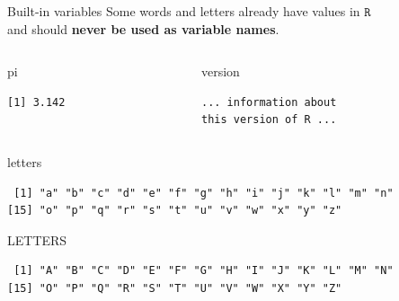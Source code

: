 \documentclass[
  11pt,
  ignorenonframetext,
]{beamer}
\newenvironment{Shaded}{\begin{snugshade}}{\end{snugshade}}
\newcommand{\NormalTok}[1]{#1}
\newcommand{\R}{\texttt{R}}
\begin{document}
\begin{frame}[fragile]{Built-in variables}
\protect\hypertarget{built-in-variables}{}
Some words and letters already have values in \(\R\)\\
and should \textbf{never be used as variable names}.

\begin{columns}[T,onlytextwidth]
\begin{column}{0.45\textwidth}
\begin{Shaded}
\begin{Highlighting}[]
\NormalTok{pi}
\end{Highlighting}
\end{Shaded}

\begin{verbatim}
[1] 3.142
\end{verbatim}
\end{column}

\begin{column}{0.45\textwidth}
\begin{Shaded}
\begin{Highlighting}[]
\NormalTok{version}
\end{Highlighting}
\end{Shaded}

\begin{verbatim}
... information about 
this version of R ...
\end{verbatim}
\end{column}
\end{columns}

\begin{Shaded}
\begin{Highlighting}[]
\NormalTok{letters}
\end{Highlighting}
\end{Shaded}

\begin{verbatim}
 [1] "a" "b" "c" "d" "e" "f" "g" "h" "i" "j" "k" "l" "m" "n"
[15] "o" "p" "q" "r" "s" "t" "u" "v" "w" "x" "y" "z"
\end{verbatim}

\begin{Shaded}
\begin{Highlighting}[]
\NormalTok{LETTERS}
\end{Highlighting}
\end{Shaded}

\begin{verbatim}
 [1] "A" "B" "C" "D" "E" "F" "G" "H" "I" "J" "K" "L" "M" "N"
[15] "O" "P" "Q" "R" "S" "T" "U" "V" "W" "X" "Y" "Z"
\end{verbatim}
\end{frame}
\end{document}
